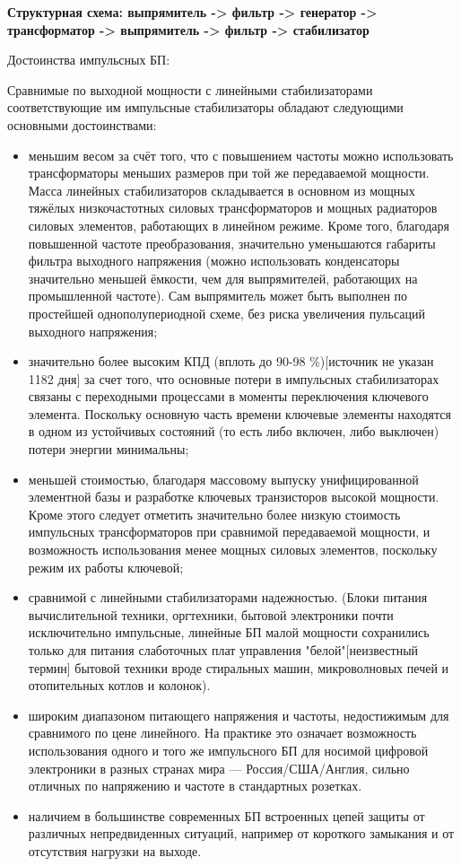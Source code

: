 \documentclass[unicode, 12pt, a4paper, oneside]{article}
\begin{document}
\textbf{Структурная схема: выпрямитель -> фильтр -> генератор -> трансформатор -> выпрямитель -> фильтр -> стабилизатор}

Достоинства импульсных БП:

Сравнимые по выходной мощности с линейными стабилизаторами соответствующие им импульсные стабилизаторы обладают следующими основными достоинствами:

\begin{itemize}
\item меньшим весом за счёт того, что с повышением частоты можно использовать трансформаторы меньших размеров при той же передаваемой мощности. Масса линейных стабилизаторов складывается в основном из мощных тяжёлых низкочастотных силовых трансформаторов и мощных радиаторов силовых элементов, работающих в линейном режиме. Кроме того, благодаря повышенной частоте преобразования, значительно уменьшаются габариты фильтра выходного напряжения (можно использовать конденсаторы значительно меньшей ёмкости, чем для выпрямителей, работающих на промышленной частоте). Сам выпрямитель может быть выполнен по простейшей однополупериодной схеме, без риска увеличения пульсаций выходного напряжения;
\item значительно более высоким КПД (вплоть до 90-98 \%)[источник не указан 1182 дня] за счет того, что основные потери в импульсных стабилизаторах связаны с переходными процессами в моменты переключения ключевого элемента. Поскольку основную часть времени ключевые элементы находятся в одном из устойчивых состояний (то есть либо включен, либо выключен) потери энергии минимальны;
\item меньшей стоимостью, благодаря массовому выпуску унифицированной элементной базы и разработке ключевых транзисторов высокой мощности. Кроме этого следует отметить значительно более низкую стоимость импульсных трансформаторов при сравнимой передаваемой мощности, и возможность использования менее мощных силовых элементов, поскольку режим их работы ключевой;
\item сравнимой с линейными стабилизаторами надежностью. (Блоки питания вычислительной техники, оргтехники, бытовой электроники почти исключительно импульсные, линейные БП малой мощности сохранились только для питания слаботочных плат управления "белой"[неизвестный термин] бытовой техники вроде стиральных машин, микроволновых печей и отопительных котлов и колонок).
\item широким диапазоном питающего напряжения и частоты, недостижимым для сравнимого по цене линейного. На практике это означает возможность использования одного и того же импульсного БП для носимой цифровой электроники в разных странах мира — Россия/США/Англия, сильно отличных по напряжению и частоте в стандартных розетках.
\item наличием в большинстве современных БП встроенных цепей защиты от различных непредвиденных ситуаций, например от короткого замыкания и от отсутствия нагрузки на выходе.
\end{itemize}
\end{document}

